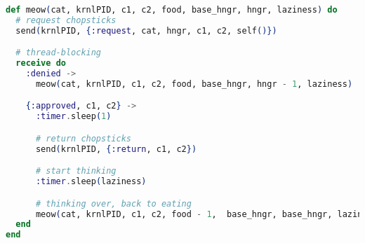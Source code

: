 \begin{lstlisting}[language=Elixir, title=How our cat brain works]
def meow(cat, krnlPID, c1, c2, food, base_hngr, hngr, laziness) do
  # request chopsticks
  send(krnlPID, {:request, cat, hngr, c1, c2, self()})

  # thread-blocking
  receive do
    :denied ->
      meow(cat, krnlPID, c1, c2, food, base_hngr, hngr - 1, laziness)

    {:approved, c1, c2} ->
      :timer.sleep(1)

      # return chopsticks
      send(krnlPID, {:return, c1, c2})

      # start thinking 
      :timer.sleep(laziness)

      # thinking over, back to eating
      meow(cat, krnlPID, c1, c2, food - 1,  base_hngr, base_hngr, laziness)
  end
end
\end{lstlisting}